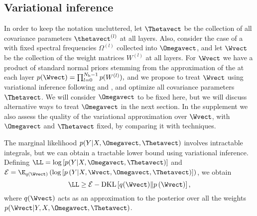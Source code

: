 \subsection{Variational inference}

In order to keep the notation uncluttered, let $\Thetavect$ be the collection of all covariance parameters $\thetavect^{(l)}$ at all layers.
Also, consider the case of a \dgp with fixed spectral frequencies $\Omega^{(l)}$ collected into $\Omegavect$, and let $\Wvect$ be the collection of the weight matrices $W^{(l)}$ at all layers.
For $\Wvect$ we have a product of standard normal priors stemming from the approximation of the  at each layer
$
p(\Wvect) = \prod_{l=0}^{N_{\mathrm{h}} - 1} p(W^{(l)}) \text{,}
$
and we propose to treat $\Wvect$ using variational inference following \citet{Kingma14} and \citet{Graves11}, and optimize all covariance parameters $\Thetavect$.
We will consider $\Omegavect$ to be fixed here, but we will discuss alternative ways to treat $\Omegavect$ in the next section.
In the supplement we also assess the quality of the variational approximation over $\Wvect$, with $\Omegavect$ and $\Thetavect$ fixed, by comparing it with \mcmc techniques.

The marginal likelihood $p(Y | X, \Omegavect, \Thetavect)$ involves intractable integrals, but we can obtain a tractable lower bound using variational inference.
Defining
$
\LL = \log \left[p(Y | X, \Omegavect, \Thetavect)\right]
$ and
$
\mathcal{E} = \E_{q(\Wvect)} \left( \log\left[ p\left(Y | X, \Wvect, \Omegavect, \Thetavect\right) \right] \right)
$,
we obtain
\begin{equation}
\LL \geq \mathcal{E}
- \mathrm{DKL}\left[q(\Wvect) \| p\left(\Wvect\right)\right] \text{,}
\end{equation}
where $q(\Wvect)$ acts as an approximation to the posterior over all the weights $p(\Wvect | Y, X, \Omegavect, \Thetavect)$.

